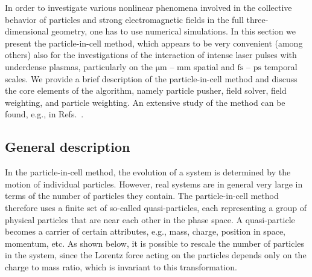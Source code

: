 \documentclass[10pt, a4paper, twoside, openright]{report}
\begin{document}



In order to investigate various nonlinear phenomena involved in the collective behavior of particles and strong electromagnetic fields in the full three-dimensional geometry, one has to use numerical simulations. In this section we present the particle-in-cell method, which appears to be very convenient (among others) also for the investigations of the interaction of intense laser pulses with underdense plasmas, particularly on the $ \mathrm{\mu m} $ -- $ \mathrm{mm} $ spatial and $ \mathrm{fs} $ -- $ \mathrm{ps} $ temporal scales. We provide a brief description of the particle-in-cell method and discuss the core elements of the algorithm, namely particle pusher, field solver, field weighting, and particle weighting. An extensive study of the method can be found, e.g., in Refs.~.

\subsection{General description}

In the particle-in-cell method, the evolution of a system is determined by the motion of individual particles. However, real systems are in general very large in terms of the number of particles they contain. The particle-in-cell method therefore uses a finite set of so-called quasi-particles, each representing a group of physical particles that are near each other in the phase space. A quasi-particle becomes a carrier of certain attributes, e.g., mass, charge, position in space, momentum, etc. As shown below, it is possible to rescale the number of particles in the system, since the Lorentz force acting on the particles depends only on the charge to mass ratio, which is invariant to this transformation. 
\end{document}
